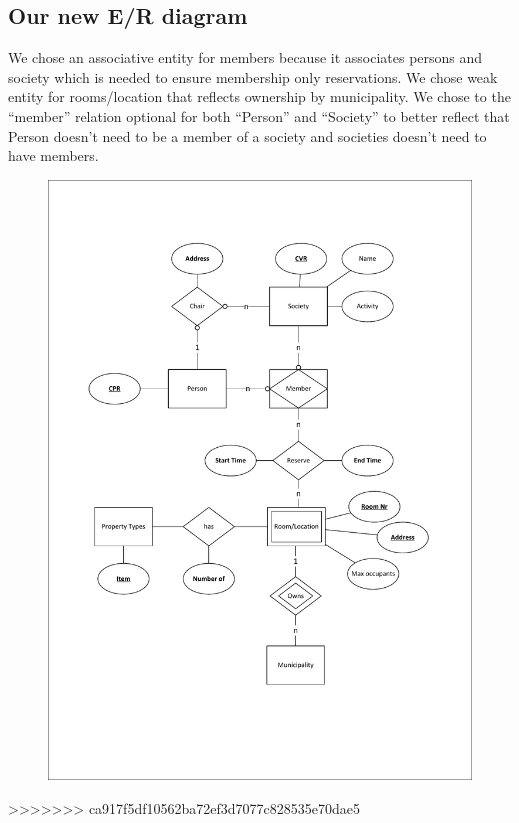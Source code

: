 \subsection{Our new E/R diagram}
We chose an associative entity for members because it associates persons and society which is needed 
to ensure membership only reservations.
We chose weak entity for rooms/location that reflects ownership by municipality. 
We chose to the ``member'' relation optional for both ``Person'' and ``Society''
to better reflect that Person doesn't need to be a member of a society and 
societies doesn't need to have members.

\newpage

\begin{figure}[h]
  \centering
  \includegraphics[scale=.66]{./ER diagram 1.pdf}
\end{figure}

\newpage
>>>>>>> ca917f5df10562ba72ef3d7077c828535e70dae5
